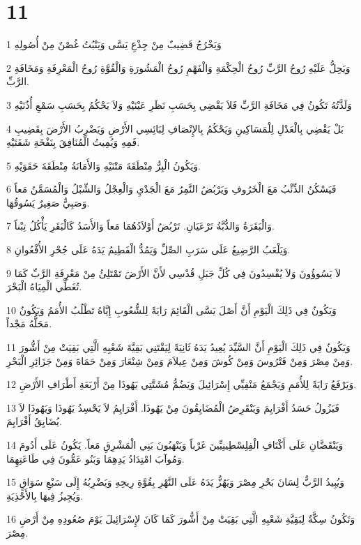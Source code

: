 \chapter{11}

\par 1 وَيَخْرُجُ قَضِيبٌ مِنْ جِذْعِ يَسَّى وَيَنْبُتُ غُصْنٌ مِنْ أُصُولِهِ
\par 2 وَيَحِلُّ عَلَيْهِ رُوحُ الرَّبِّ رُوحُ الْحِكْمَةِ وَالْفَهْمِ رُوحُ الْمَشُورَةِ وَالْقُوَّةِ رُوحُ الْمَعْرِفَةِ وَمَخَافَةِ الرَّبِّ.
\par 3 وَلَذَّتُهُ تَكُونُ فِي مَخَافَةِ الرَّبِّ فَلاَ يَقْضِي بِحَسَبِ نَظَرِ عَيْنَيْهِ وَلاَ يَحْكُمُ بِحَسَبِ سَمْعِ أُذُنَيْهِ
\par 4 بَلْ يَقْضِي بِالْعَدْلِ لِلْمَسَاكِينِ وَيَحْكُمُ بِالإِنْصَافِ لِبَائِسِي الأَرْضِ وَيَضْرِبُ الأَرْضَ بِقَضِيبِ فَمِهِ وَيُمِيتُ الْمُنَافِقَ بِنَفْخَةِ شَفَتَيْهِ.
\par 5 وَيَكُونُ الْبِرُّ مِنْطَقَةَ مَتْنَيْهِ وَالأَمَانَةُ مِنْطَقَةَ حَقَوَيْهِ.
\par 6 فَيَسْكُنُ الذِّئْبُ مَعَ الْخَرُوفِ وَيَرْبُضُ النَّمِرُ مَعَ الْجَدْيِ وَالْعِجْلُ وَالشِّبْلُ وَالْمُسَمَّنُ مَعاً وَصَبِيٌّ صَغِيرٌ يَسُوقُهَا.
\par 7 وَالْبَقَرَةُ وَالدُّبَّةُ تَرْعَيَانِ. تَرْبُضُ أَوْلاَدُهُمَا مَعاً وَالأَسَدُ كَالْبَقَرِ يَأْكُلُ تِبْناً.
\par 8 وَيَلْعَبُ الرَّضِيعُ عَلَى سَرَبِ الصِّلِّ وَيَمُدُّ الْفَطِيمُ يَدَهُ عَلَى جُحْرِ الأُفْعُوانِ.
\par 9 لاَ يَسُوؤُونَ وَلاَ يُفْسِدُونَ فِي كُلِّ جَبَلِ قُدْسِي لأَنَّ الأَرْضَ تَمْتَلِئُ مِنْ مَعْرِفَةِ الرَّبِّ كَمَا تُغَطِّي الْمِيَاهُ الْبَحْرَ.
\par 10 وَيَكُونُ فِي ذَلِكَ الْيَوْمِ أَنَّ أَصْلَ يَسَّى الْقَائِمَ رَايَةً لِلشُّعُوبِ إِيَّاهُ تَطْلُبُ الأُمَمُ وَيَكُونُ مَحَلُّهُ مَجْداً.
\par 11 وَيَكُونُ فِي ذَلِكَ الْيَوْمِ أَنَّ السَّيِّدَ يُعِيدُ يَدَهُ ثَانِيَةً لِيَقْتَنِي بَقِيَّةَ شَعْبِهِ الَّتِي بَقِيَتْ مِنْ أَشُّورَ وَمِنْ مِصْرَ وَمِنْ فَتْرُوسَ وَمِنْ كُوشَ وَمِنْ عِيلاَمَ وَمِنْ شِنْعَارَ وَمِنْ حَمَاةَ وَمِنْ جَزَائِرِ الْبَحْرِ.
\par 12 وَيَرْفَعُ رَايَةً لِلأُمَمِ وَيَجْمَعُ مَنْفِيِّي إِسْرَائِيلَ وَيَضُمُّ مُشَتَّتِي يَهُوذَا مِنْ أَرْبَعَةِ أَطْرَافِ الأَرْضِ.
\par 13 فَيَزُولُ حَسَدُ أَفْرَايِمَ وَيَنْقَرِضُ الْمُضَايِقُونَ مِنْ يَهُوذَا. أَفْرَايِمُ لاَ يَحْسِدُ يَهُوذَا وَيَهُوذَا لاَ يُضَايِقُ أَفْرَايِمَ.
\par 14 وَيَنْقَضَّانِ عَلَى أَكْتَافِ الْفِلِسْطِينِيِّينَ غَرْباً وَيَنْهَبُونَ بَنِي الْمَشْرِقِ مَعاً. يَكُونُ عَلَى أَدُومَ وَمُوآبَ امْتِدَادُ يَدِهِمَا وَبَنُو عَمُّونَ فِي طَاعَتِهِمَا.
\par 15 وَيُبِيدُ الرَّبُّ لِسَانَ بَحْرِ مِصْرَ وَيَهُزُّ يَدَهُ عَلَى النَّهْرِ بِقُوَّةِ رِيحِهِ وَيَضْرِبُهُ إِلَى سَبْعِ سَوَاقٍ وَيُجِيزُ فِيهَا بِالأَحْذِيَةِ.
\par 16 وَتَكُونُ سِكَّةٌ لِبَقِيَّةِ شَعْبِهِ الَّتِي بَقِيَتْ مِنْ أَشُّورَ كَمَا كَانَ لإِسْرَائِيلَ يَوْمَ صُعُودِهِ مِنْ أَرْضِ مِصْرَ.

